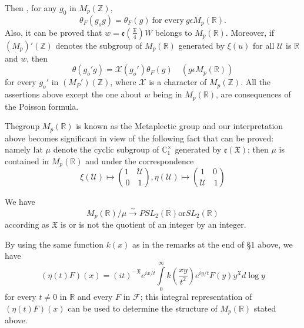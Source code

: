 Then , for any $g_{0}$ in $M_{p}(\mathbb{Z})$,
\begin{equation*}
  \theta_{F}(g_{o}g)=\theta_{F}(g) ~\text{for every}~
  g\epsilon M_{p}(\mathbb{R}).
\end{equation*}
 Also, it can be proved that
 $w=\mathfrak{e}\left(\frac{\mathfrak{X}}{4}\right) W$ belongs to
 $M_{p}(\mathbb{R})$. Moreover, if $(M_{p})'(\mathbb{Z})$ denotes the
 subgroup of $M_{p}(\mathbb{R})$ generated by $\xi(u)$ for all
 $\mathscr{U}$ is $\mathbb{R}$ and $w$, then
\begin{equation*}
  \theta(g_{o}'g)=\mathcal{X}(g_{o}')\theta_{F}(g)\quad 
  (g\epsilon M_{p}(\mathbb{R}))
\end{equation*}
 for every $g_{o}'$ in $(M_{P}')(\mathbb{Z})$, where $\mathcal{X}$ is
 a character of $M_{p}(\mathbb{Z})$. All the assertions above except
 the one about $w$ being in $M_{p}(\mathbb{R})$, are consequences of
 the Poisson formula.

 The\pageoriginale group $M_{p}(\mathbb{R})$ is known as the Metaplectic group and
 our interpretation above becomes significant in view of the
 following  fact that can be proved: namely lat $\mu$ denote the
 cyclic subgroup of $\mathbb{C}_{1}^\times $ generated by
 $\mathfrak{e}(\mathfrak{X})$; then $\mu$ is contained in
 $M_{p}(\mathbb{R})$ and under the correspondence
\begin{equation*}
\xi(\mathscr{U})\mapsto \binom{1\quad \mathscr{U}}{0\quad 1},
\eta(\mathscr{U})\mapsto \binom{1\quad 0}{\mathscr{U}\quad 1}
\end{equation*}

 We have
\begin{equation*}
  M_{p}(\mathbb{R})/\mu\xrightarrow\sim PSL_{2}(\mathbb{R})
  \text{or}SL_{2}(\mathbb{R})
\end{equation*}
 according as $\mathfrak{X}$ is or is not the quotient of an integer by
 an integer. 

\begin{remark*}
  By using the same function $k(x)$ as in the remarks at the end of
  \S 1 above, we have
  \begin{equation*}
    (\eta(t)F)(x)=(it)^{-\mathfrak{X}}e^{ix/t}\int\limits_{0}^{\infty}
    k\left(\frac{xy}{t^{2}}\right)e^{iy/t}F(y)y^{\mathfrak{X}}d\log y
  \end{equation*}
  for every $t\neq 0$ in $\mathbb{R}$ and every $F$ in $\mathscr{F}$;
  this integral representation of $(\eta(t)F)(x)$ can be used to
  determine the structure of $M_{p}(\mathbb{R})$ stated above.
\end{remark*}
